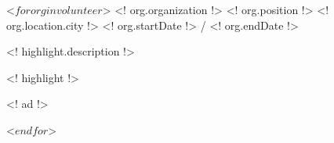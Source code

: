\begin{cventries}
 <$ for org in volunteer $>
  \cventry
    {<! org.organization !>}
    {<! org.position !>}
    {<! org.location.city !>}
    {<! org.startDate !> / <! org.endDate !>}
    {
          \begin{cvitems}
                    \item{<! highlight.description !>}
                    \item{<! highlight !>}
                    \begin{cvitemssub}
                        \item{<! ad !>}
                    \end{cvitemssub}
          \end{cvitems}
    }
 <$ endfor $>
\end{cventries}

